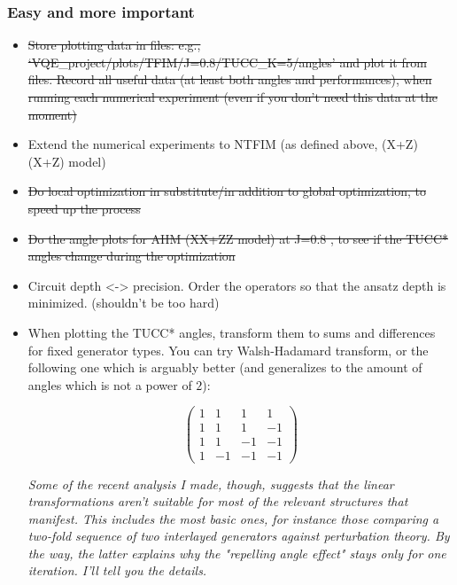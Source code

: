 \documentclass[10pt, a4paper]{article}
\begin{document}
\subsubsection*{Easy and more important}
\begin{itemize}
\item \st{Store plotting data in files: e.g., `VQE\_project/plots/TFIM/J=0.8/TUCC\_K=5/angles' and plot it from files. Record all useful data (at least both angles and performances), when running each numerical experiment (even if you don't need this data at the moment)}
\item Extend the numerical experiments to NTFIM (as defined above, (X+Z)(X+Z) model)
\item \st{Do local optimization in substitute/in addition to global optimization, to speed up the process}
\item \st{Do the angle plots for AHM (XX+ZZ model) at J=0.8 , to see if the TUCC* angles change during the optimization}

\item Circuit depth <-> precision. Order the operators so that the ansatz depth is minimized. (shouldn't be too hard)

\item When plotting the TUCC* angles, transform them to sums and differences for fixed generator types. You can try Walsh-Hadamard transform, or the following one which is arguably better (and generalizes to the amount of angles which is not a power of $2$):

\begin{equation}
\begin{pmatrix}
1 & 1 & 1 & 1\\
1 & 1 & 1 & -1\\
1 & 1 & -1 & -1 \\
1 & -1 & -1 & -1
\end{pmatrix}
\end{equation}


\textit{Some of the recent analysis I made, though, suggests that the linear transformations aren't suitable for most of the relevant structures that manifest. This includes the most basic ones, for instance those comparing a two-fold sequence of two interlayed generators against perturbation theory. By the way, the latter explains why the "repelling angle effect" stays only for one iteration. I'll tell you the details.}

\end{itemize}
\end{document}
